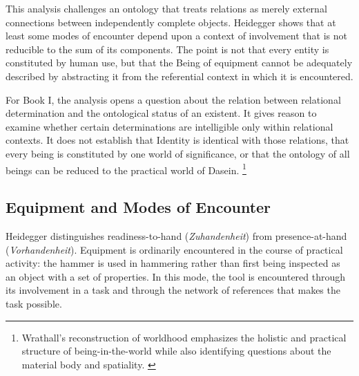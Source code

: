 \label{para:VS.B01.P01.C08.S11.SS05.P003}

This analysis challenges an ontology that treats relations
as merely external connections between independently
complete objects. Heidegger shows that at least some
modes of encounter depend upon a context of involvement
that is not reducible to the sum of its components.
The point is not that every entity is constituted by
human use, but that the Being of equipment cannot be
adequately described by abstracting it from the
referential context in which it is encountered.

\label{para:VS.B01.P01.C08.S11.SS05.P004}

For Book I, the analysis opens a question about the
relation between relational determination and the
ontological status of an existent. It gives reason
to examine whether certain determinations are
intelligible only within relational contexts. It does
not establish that Identity is identical with those
relations, that every being is constituted by one
world of significance, or that the ontology of all
beings can be reduced to the practical world of Dasein.
\footnote{Wrathall's reconstruction of worldhood
emphasizes the holistic and practical structure of
being-in-the-world while also identifying questions
about the material body and spatiality. \cite{WrathallHeideggerSEP2025}}



\subsection{Equipment and Modes of Encounter}
\label{subsec:ch08-heidegger-equipment}

\label{para:VS.B01.P01.C08.S11.SS06.P001}

Heidegger distinguishes readiness-to-hand
(\textit{Zuhandenheit}) from presence-at-hand
(\textit{Vorhandenheit}). Equipment is ordinarily
encountered in the course of practical activity:
the hammer is used in hammering rather than first
being inspected as an object with a set of properties.
In this mode, the tool is encountered through its
involvement in a task and through the network of
references that makes the task possible.
\cite[§§15--16]{HeideggerBeingTime}

